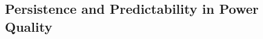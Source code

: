 \documentclass[review]{elsarticle}
\begin{document}

\subsection{Persistence and Predictability in Power Quality}
\end{document}
